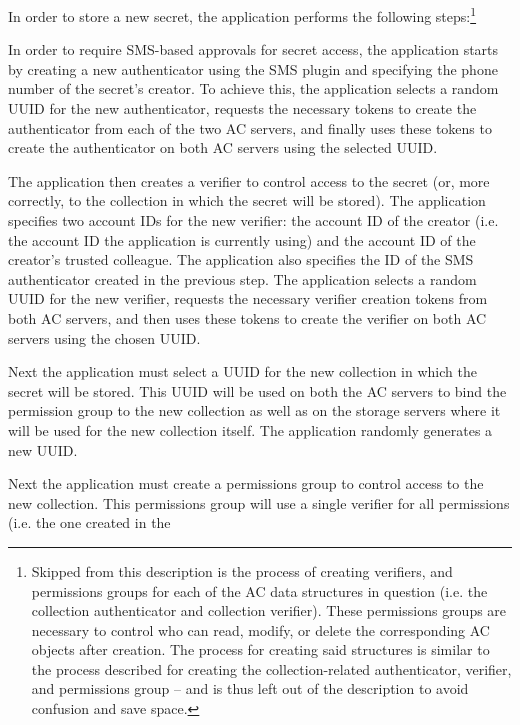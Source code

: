 In order to store a new secret, the application performs the following
steps:\footnote{Skipped from this description is the process of
  creating verifiers, and permissions groups for each of the AC data
  structures in question (i.e. the collection authenticator and
  collection verifier). These permissions groups are necessary to
  control who can read, modify, or delete the corresponding AC objects
  after creation. The process for creating said structures is similar
  to the process described for creating the collection-related
  authenticator, verifier, and permissions group -- and is thus left
  out of the description to avoid confusion and save space.}

\begin{packed_enum}
\item In order to require SMS-based approvals for secret access, the
  application starts by creating a new authenticator using the SMS
  plugin and specifying the phone number of the secret's creator. To
  achieve this, the application selects a random UUID for the new
  authenticator, requests the necessary tokens to create the
  authenticator from each of the two AC servers, and finally uses
  these tokens to create the authenticator on both AC servers using
  the selected UUID.
\item The application then creates a verifier to control access to the
  secret (or, more correctly, to the collection in which the secret
  will be stored). The application specifies two account IDs for the
  new verifier: the account ID of the creator (i.e. the account ID the
  application is currently using) and the account ID of the creator's
  trusted colleague. The application also specifies the ID of the SMS
  authenticator created in the previous step. The application selects
  a random UUID for the new verifier, requests the necessary verifier
  creation tokens from both AC servers, and then uses these tokens to
  create the verifier on both AC servers using the chosen UUID.
\item Next the application must select a UUID for the new collection in
  which the secret will be stored. This UUID will be used on both the AC
  servers to bind the permission group to the new collection as well
  as on the storage servers where it will be used for the new
  collection itself. The application randomly generates a new UUID.
\item Next the application must create a permissions group to control
  access to the new collection. This permissions group will use a
  single verifier for all permissions (i.e. the one created in the

\end{packed_enum}
